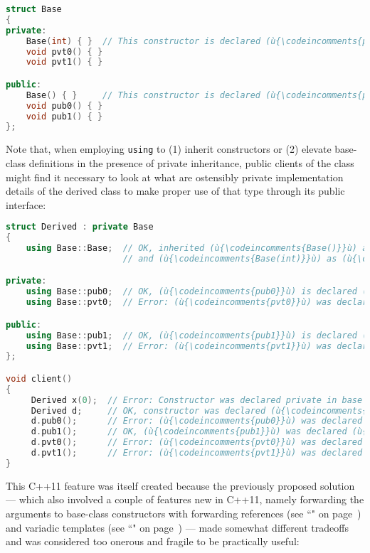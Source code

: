 \begin{lstlisting}[language=C++]
struct Base
{
private:
    Base(int) { }  // This constructor is declared (ù{\codeincomments{private}}ù) in the base class.
    void pvt0() { }
    void pvt1() { }

public:
    Base() { }     // This constructor is declared (ù{\codeincomments{public}}ù) in the base class.
    void pub0() { }
    void pub1() { }
};
\end{lstlisting}
    
\noindent Note that, when employing \texttt{using} to (1) inherit constructors or
(2) elevate base-class definitions in the presence of private
inheritance, public clients of the class might find it necessary 
to look at what are ostensibly private implementation details of the
derived class to make proper use of that type through its
public interface:

\begin{lstlisting}[language=C++]
struct Derived : private Base
{
    using Base::Base;  // OK, inherited (ù{\codeincomments{Base()}}ù) as (ù{\codeincomments{public}}ù) constructor
                       // and (ù{\codeincomments{Base(int)}}ù) as (ù{\codeincomments{private}}ù) constructor

private:
    using Base::pub0;  // OK, (ù{\codeincomments{pub0}}ù) is declared (ù{\codeincomments{private}}ù) in derived class.
    using Base::pvt0;  // Error: (ù{\codeincomments{pvt0}}ù) was declared private in base class.

public:
    using Base::pub1;  // OK, (ù{\codeincomments{pub1}}ù) is declared (ù{\codeincomments{public}}ù) in derived class.
    using Base::pvt1;  // Error: (ù{\codeincomments{pvt1}}ù) was declared (ù{\codeincomments{private}}ù) in base class.
};

void client()
{
     Derived x(0);  // Error: Constructor was declared private in base class.
     Derived d;     // OK, constructor was declared (ù{\codeincomments{public}}ù) in base class.
     d.pub0();      // Error: (ù{\codeincomments{pub0}}ù) was declared (ù{\codeincomments{private}}ù) in derived class.
     d.pub1();      // OK, (ù{\codeincomments{pub1}}ù) was declared (ù{\codeincomments{public}}ù) in derived class.
     d.pvt0();      // Error: (ù{\codeincomments{pvt0}}ù) was declared private in base class.
     d.pvt1();      // Error: (ù{\codeincomments{pvt1}}ù) was declared private in base class.
}
\end{lstlisting}
    
\noindent This C++11 feature was itself created because the previously proposed
solution --- which also involved a couple of features new in C++11, namely
forwarding the arguments to base-class constructors with
forwarding references (see ``" on page~\pageref{forwardingref}) and variadic
templates (see ``" on page~\pageref{variadictemplate}) --- made somewhat different tradeoffs and was
considered too onerous and fragile to be practically useful:

